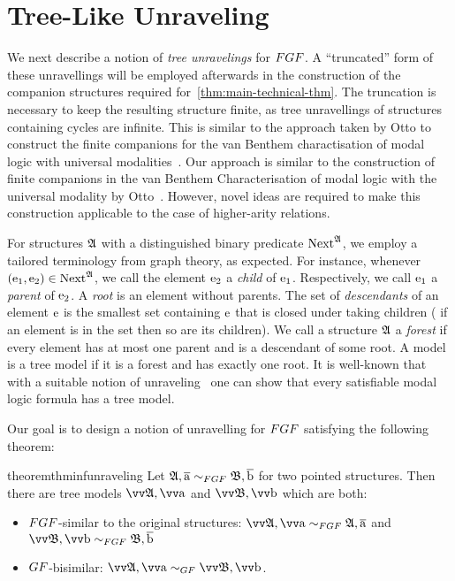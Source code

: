 
\section{Tree-Like Unraveling}\label{sec:unraveling}
We next describe a notion of \emph{tree unravelings} for $\FGF$.
A ``truncated'' form of these unravellings will be employed afterwards in the construction of the companion structures required for~\cref{thm:main-technical-thm}.
The truncation is necessary to keep the resulting structure finite, as tree unravellings of structures containing cycles are infinite.
This is similar to the approach taken by Otto to construct the finite companions for the van Benthem charactisation of modal logic with universal modalities~\cite[Proof of Lemma 38]{Otto04}.
Our approach is similar to the construction of finite companions in the van Benthem Characterisation of modal logic with the universal modality by Otto~\cite[Proof of Lemma 38]{Otto04}.
However, novel ideas are required to make this construction applicable to the case of higher-arity relations.

For structures ${\mathfrak{A}}$ with a distinguished binary predicate $\mathrm{Next}^{{\mathfrak{A}}}$, we employ a tailored terminology from graph theory, as expected.
For instance, whenever $(\mathrm{e}_1, \mathrm{e}_2) \in \mathrm{Next}^{{\mathfrak{A}}}$, we call the element $\mathrm{e}_2$ a \emph{child} of $\mathrm{e}_1$. Respectively, we call $\mathrm{e}_1$ a \emph{parent} of $\mathrm{e}_2$.
A \emph{root} is an element without parents.
The set of \emph{descendants} of an element $\mathrm{e}$ is the smallest set containing $\mathrm{e}$ that is closed under taking children (\ie{} if an element is in the set then so are its children).
We call a structure ${\mathfrak{A}}$ a \emph{forest} if every element has at most one parent and is a descendant of some root.
A model is a tree model if it is a forest and has exactly one root.
It is well-known that with a suitable notion of unraveling~\cite[Prop. 3]{Rosen97} one can show that every satisfiable modal logic formula has a tree model.

Our goal is to design a notion of unravelling for $\FGF$ satisfying the following theorem:
\begin{restatable}{theorem}{thminfunraveling}\label{thm:inf-unraveling-upgrading}
  Let $\str{A}, \elemtuplea \bisimto_{\FGF} \str{B}, \elemtupleb$ for two pointed structures.
  Then there are tree models $\unravel{A}, \elemtuptuplea$ and $\unravel{B}, \elemtuptupleb$ which are both:
  \begin{itemize}
    \item $\FGF$-similar to the original structures: $\unravel{A}, \elemtuptuplea \bisimto_{\FGF} \str{A}, \elemtuplea$ and $\unravel{B}, \elemtuptupleb \bisimto_{\FGF} \str{B}, \elemtupleb$
    \item $\GF$-bisimilar: $\unravel{A}, \elemtuptuplea \bisimto_{\GF} \unravel{B}, \elemtuptupleb$.
  \end{itemize}
\end{restatable}

